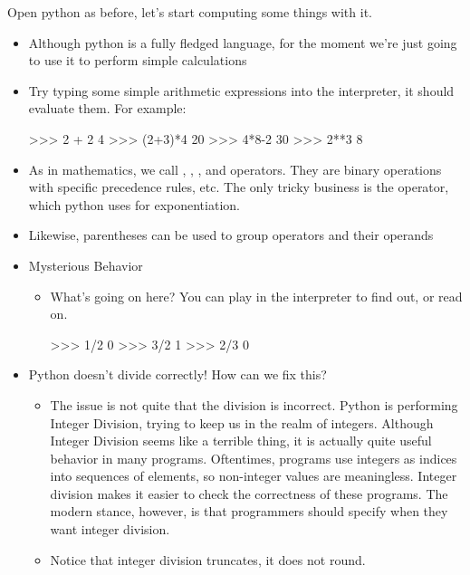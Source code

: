 

Open python as before, let's start computing some things with it.

\begin{itemize}
    \item Although python is a fully fledged language, for the moment we're just going to use it to perform simple calculations
    \item Try typing some simple arithmetic expressions into the interpreter, it should evaluate them. For example:
\begin{codeblock}
>>> 2 + 2
4
>>> (2+3)*4
20
>>> 4*8-2
30
>>> 2**3
8
\end{codeblock}
    \item As in mathematics, we call \code{+}, \code{-}, \code{*}, and \code{/} operators. They are binary operations with specific precedence rules, etc.
        The only tricky business is the \code{**} operator, which python uses for exponentiation.
    \item Likewise, parentheses can be used to group operators and their operands
    \item Mysterious Behavior
    \begin{itemize}
        \item What's going on here? You can play in the interpreter to find out, or read on.
\begin{codeblock}
>>> 1/2
0
>>> 3/2
1
>>> 2/3
0
\end{codeblock}
    \end{itemize}
    \item Python doesn't divide correctly! How can we fix this?
    \begin{itemize}
        \item The issue is not quite that the division is incorrect.
            Python is performing Integer Division, trying to keep us in the realm of integers.
            Although Integer Division seems like a terrible thing, it is actually quite useful behavior in many programs.
            Oftentimes, programs use integers as indices into sequences of elements, so non-integer values are meaningless.
            Integer division makes it easier to check the correctness of these programs.
            The modern stance, however, is that programmers should specify when they want integer division.
        \item Notice that integer division truncates, it does not round.

\end{itemize}
\end{itemize}
